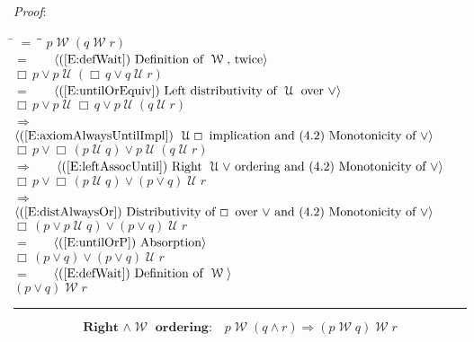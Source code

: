 \documentclass[12pt, fleqn, leqno]{article}
\newcommand{\lgap}{2pt}                             %
\newcommand{\mymathindent}{24pt}                    %
\newcommand{\impl}{\ensuremath{\Rightarrow}}        %
\newcommand{\Until}{\;\mathcal{U}\;}
\newcommand{\Wait}{\;\mathcal{W}\;}
\newcommand{\Always}{\Box\,}
\newcommand{\myqed}{\rule[-.23ex]{1.2ex}{2.0ex}}
\newcommand{\myqedtab}{\hspace{384pt}}              %
\newcommand{\Gll} {\langle}                         %
\newcommand{\Ggg} {\rangle}                         %
\newcommand{\Hint}[1]     {\ \ \ $\Gll              \mbox{#1} \Ggg$ }   %
\begin{document}
\emph{Proof}:
\begin{tabbing}
\hspace{\mymathindent} \= $= \;$ \= \myqedtab \= \kill
\> \>   $p \Wait (q \Wait r)$\\[\lgap]
\> $=$ \> \Hint{(\ref{E:defWait}) Definition of $\Wait$, twice} \\[\lgap]
\> \>   $\Always p\lor p\Until (\Always q\lor q \Until r)$\\[\lgap]
\> $=$  \>  \Hint{(\ref{E:untilOrEquiv}) Left distributivity of $\Until$ over $\lor$}\\[\lgap]
\> \>   $\Always p\lor p\Until \Always q\lor p\Until (q \Until r)$\\[\lgap]
\> $\impl$ \> \Hint{(\ref{E:axiomAlwaysUntilImpl}) $\Until\Always$ implication and (4.2) Monotonicity of $\lor$}\\[\lgap]
\> \>   $\Always p\lor \Always (p\Until q)\lor p\Until (q \Until r)$\\[\lgap]
\> $\impl$ \> \Hint{(\ref{E:leftAssocUntil})  Right $\Until \lor$ ordering and (4.2) Monotonicity of $\lor$} \\[\lgap]
\> \>   $\Always p\lor \Always (p\Until q)\lor (p\lor q) \Until r$\\[\lgap]
  \> $\impl$  \>  \Hint{(\ref{E:distAlwaysOr}) Distributivity of $\Always$ over $\lor$ and (4.2) Monotonicity of $\lor$}\\[\lgap]
\> \>   $\Always (p\lor p\Until q)\lor (p\lor q) \Until r$\\[\lgap]
\> $=$ \> \Hint{(\ref{E:untilOrP}) Absorption} \\[\lgap]
\> \>   $\Always (p\lor q)\lor (p\lor q) \Until r$\\[\lgap]
\> $=$ \> \Hint{(\ref{E:defWait}) Definition of $\Wait$} \\[\lgap]
\> \>   $(p\lor q) \Wait r$ \quad \myqed
\end{tabbing}
\begin{equation}\label{E:rightAssocWait}
\textbf{Right $\land\Wait$ ordering:}\quad p \Wait (q \land r) \impl (p \Wait q) \Wait r
\end{equation}
\end{document}
